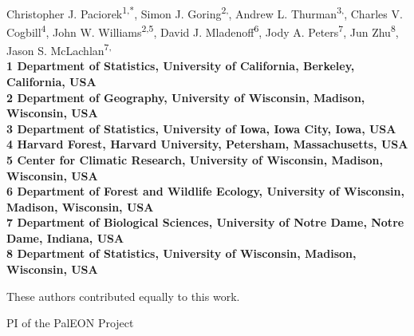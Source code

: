 \documentclass[10pt,letterpaper]{article}
\date{}
\begin{document}
\vspace*{0.35in}

\begin{flushleft}
{\Large
\textbf{}
}
\newline
\\
Christopher J. Paciorek\textsuperscript{1,*},
Simon J. Goring\textsuperscript{2,\Yinyang},
Andrew L. Thurman\textsuperscript{3,\Yinyang},
Charles V. Cogbill\textsuperscript{4},
John W. Williams\textsuperscript{2,5},
David J. Mladenoff\textsuperscript{6},
Jody A. Peters\textsuperscript{7},
Jun Zhu\textsuperscript{8},
Jason S. McLachlan\textsuperscript{7,\ddag}
\\
\bigskip
\bf{1} Department of Statistics, University of California, Berkeley, California,
USA
\\
\bf{2} Department of Geography, University of Wisconsin, Madison, Wisconsin,
USA
\\
\bf{3} Department of Statistics, University of Iowa, Iowa City, Iowa, USA
\\
\bf{4} Harvard Forest, Harvard University, Petersham, Massachusetts, USA
\\
\bf{5} Center for Climatic Research, University of Wisconsin, Madison,
Wisconsin, USA
\\
\bf{6} Department of Forest and Wildlife Ecology, University of Wisconsin,
Madison, Wisconsin, USA
\\
\bf{7} Department of Biological Sciences, University of Notre Dame, Notre
Dame, Indiana, USA
\\
\bf{8} Department of Statistics, University of Wisconsin, Madison, Wisconsin,
USA
\\
\bigskip

% 
%
\Yinyang These authors contributed equally to this work.

 \ddag PI of the PalEON Project


\end{flushleft}
\end{document}
